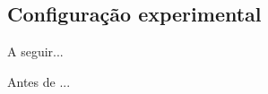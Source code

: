 






\subsection{Configuração experimental}
\label{subsec:configuracaoexperimental}

% 




  



























A seguir...

Antes de ...



	









